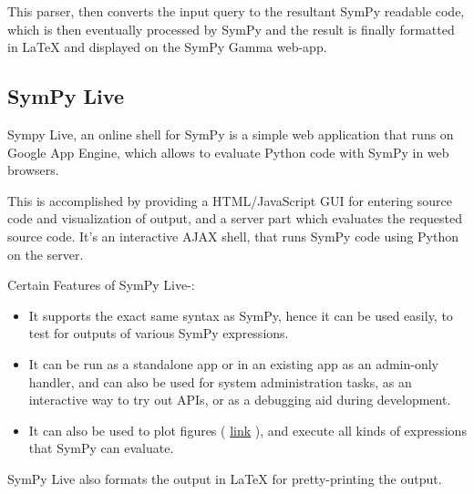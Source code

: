 This parser, then converts the input query to the resultant SymPy
readable code, which is then eventually processed by SymPy and the
result is finally formatted in LaTeX and displayed on the SymPy Gamma
web-app.

\subsection{SymPy Live}\label{sympy-live}

Sympy Live, an online shell for SymPy is a simple web application that
runs on Google App Engine, which allows to evaluate Python code with
SymPy in web browsers.

This is accomplished by providing a HTML/JavaScript GUI for entering
source code and visualization of output, and a server part which
evaluates the requested source code. It's an interactive AJAX shell,
that runs SymPy code using Python on the server.

Certain Features of SymPy Live-:

\begin{itemize}
\item
  It supports the exact same syntax as SymPy, hence it can be used
  easily, to test for outputs of various SymPy expressions.
\item
  It can be run as a standalone app or in an existing app as an
  admin-only handler, and can also be used for system administration
  tasks, as an interactive way to try out APIs, or as a debugging aid
  during development.
\item
  It can also be used to plot figures (
  \href{http://live.sympy.org/?evaluate=from\%20sympy\%20import\%20symbols\%0Afrom\%20sympy.plotting\%20import\%20textplot\%0Ax\%20\%3D\%20symbols(\%27x\%27)\%0Atextplot(x**2\%2C0\%2C5)\%0A\%23--\%0A}{link}
  ), and execute all kinds of expressions that SymPy can evaluate.
\end{itemize}

SymPy Live also formats the output in LaTeX for pretty-printing the
output.